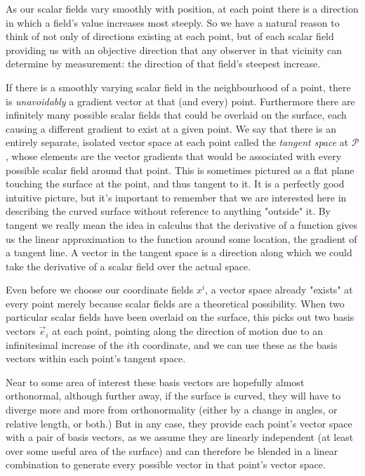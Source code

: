 As our scalar fields vary smoothly with position, at each point there is a direction in which a field's value increases most steeply. So we have a natural reason to think of not only of directions existing at each point, but of each scalar field providing us with an objective direction that any observer in that vicinity can determine by measurement: the direction of that field's steepest increase. 

If there is a smoothly varying scalar field in the neighbourhood of a point, there is \textit{unavoidably} a gradient vector at that (and every) point. Furthermore there are infinitely many possible scalar fields that could be overlaid on the surface, each causing a different gradient to exist at a given point. We say that there is an entirely separate, isolated vector space at each point called the \textit{tangent space} at $\mathcal{P}$, whose elements are the vector gradients that would be associated with every possible scalar field around that point. This is sometimes pictured as a flat plane touching the surface at the point, and thus tangent to it. It is a perfectly good intuitive picture, but it's important to remember that we are interested here in describing the curved surface without reference to anything "outside" it. By tangent we really mean the idea in calculus that the derivative of a function gives us the linear approximation to the function around some location, the gradient of a tangent line. A vector in the tangent space is a direction along which we could take the derivative of a scalar field over the actual space.

Even before we choose our coordinate fields $x^i$, a vector space already "exists" at every point merely because scalar fields are a theoretical possibility. When two particular scalar fields have been overlaid on the surface, this picks out two basis vectors $\vec{e}_i$ at each point, pointing along the direction of motion due to an infinitesimal increase of the $i$th coordinate, and we can use these as the basis vectors within each point's tangent space.

Near to some area of interest these basis vectors are hopefully almost orthonormal, although further away, if the surface is curved, they will have to diverge more and more from orthonormality (either by a change in angles, or relative length, or both.) But in any case, they provide each point's vector space with a pair of basis vectors, as we assume they are linearly independent (at least over some useful area of the surface) and can therefore be blended in a linear combination to generate every possible vector in that point's vector space. 

